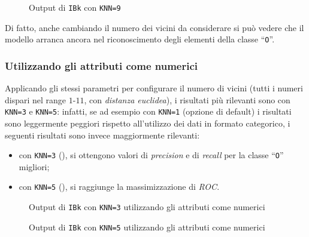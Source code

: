 \begin{figure}[H]
  \centering
  \caption{Output di \texttt{IBk} con \texttt{KNN=9}}%
  \label{fig:ibk:9}
\end{figure}

Di fatto, anche cambiando il numero dei vicini da considerare si può vedere che il modello arranca ancora nel riconoscimento degli elementi della classe ``\texttt{O}''.

\subsubsection{Utilizzando gli attributi come numerici}\label{subsub:ibk:numeric}

Applicando gli stessi parametri per configurare il numero di vicini (tutti i numeri dispari nel range \(1\)-\(11\), con \emph{distanza euclidea}), i risultati più rilevanti sono con \texttt{KNN=3} e \texttt{KNN=5}:
infatti, se ad esempio con \texttt{KNN=1} (opzione di default) i risultati sono leggermente peggiori rispetto all'utilizzo dei dati in formato categorico, i seguenti risultati sono invece maggiormente rilevanti:

\begin{itemize}
  \item con \texttt{KNN=3} (), si ottengono valori di \emph{precision} e di \emph{recall} per la classe ``\texttt{O}'' migliori;
  \item con \texttt{KNN=5} (), si raggiunge la massimizzazione di \emph{ROC}.
\end{itemize}


\begin{figure}[H]
  \centering
  \caption{Output di \texttt{IBk} con \texttt{KNN=3} utilizzando gli attributi come numerici}%
  \label{fig:ibk:3-num}
\end{figure}

\begin{figure}[H]
  \centering
  \caption{Output di \texttt{IBk} con \texttt{KNN=5} utilizzando gli attributi come numerici}%
  \label{fig:ibk:5-num}
\end{figure}


